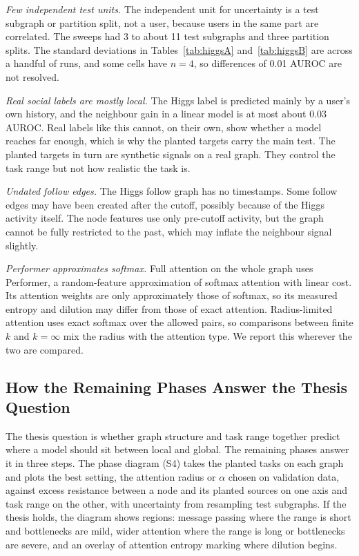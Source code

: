 \emph{Few independent test units.} The independent unit for uncertainty is a test subgraph or partition split, not a user, because users in the same part are correlated. The sweeps had 3 to about 11 test subgraphs and three partition splits. The standard deviations in Tables~\ref{tab:higgsA} and~\ref{tab:higgsB} are across a handful of runs, and some cells have $n=4$, so differences of 0.01 AUROC are not resolved.

\emph{Real social labels are mostly local.} The Higgs label is predicted mainly by a user's own history, and the neighbour gain in a linear model is at most about 0.03 AUROC. Real labels like this cannot, on their own, show whether a model reaches far enough, which is why the planted targets carry the main test. The planted targets in turn are synthetic signals on a real graph. They control the task range but not how realistic the task is.

\emph{Undated follow edges.} The Higgs follow graph has no timestamps. Some follow edges may have been created after the cutoff, possibly because of the Higgs activity itself. The node features use only pre-cutoff activity, but the graph cannot be fully restricted to the past, which may inflate the neighbour signal slightly.

\emph{Performer approximates softmax.} Full attention on the whole graph uses Performer, a random-feature approximation of softmax attention with linear cost. Its attention weights are only approximately those of softmax, so its measured entropy and dilution may differ from those of exact attention. Radius-limited attention uses exact softmax over the allowed pairs, so comparisons between finite $k$ and $k=\infty$ mix the radius with the attention type. We report this wherever the two are compared.

\subsection{How the Remaining Phases Answer the Thesis Question}
The thesis question is whether graph structure and task range together predict where a model should sit between local and global. The remaining phases answer it in three steps. The phase diagram (S4) takes the planted tasks on each graph and plots the best setting, the attention radius or $\alpha$ chosen on validation data, against excess resistance between a node and its planted sources on one axis and task range on the other, with uncertainty from resampling test subgraphs. If the thesis holds, the diagram shows regions: message passing where the range is short and bottlenecks are mild, wider attention where the range is long or bottlenecks are severe, and an overlay of attention entropy marking where dilution begins.

